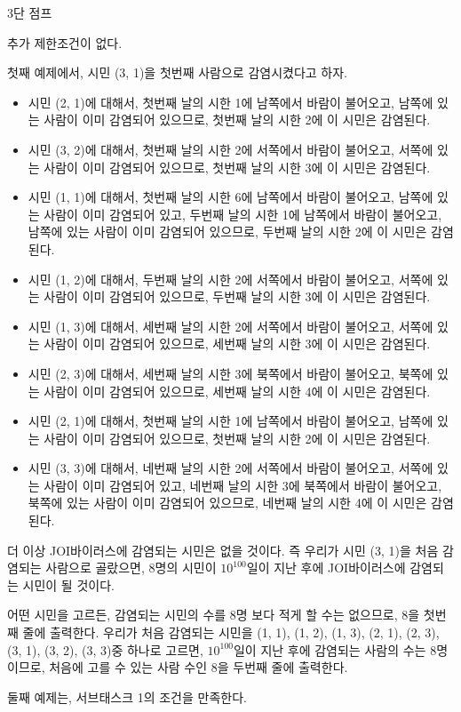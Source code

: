 \begin{problem}{3단 점프}
	
	
	추가 제한조건이 없다.
	
	\Examples
	
	\begin{example}
	\end{example}
	
	\Note
	
	첫째 예제에서, 시민 (3, 1)을 첫번째 사람으로 감염시켰다고 하자.
	
	\begin{itemize}
		\item 시민 (2, 1)에 대해서, 첫번째 날의 시한 1에 남쪽에서 바람이 불어오고, 남쪽에 있는 사람이 이미 감염되어 있으므로, 첫번째 날의 시한 2에 이 시민은 감염된다.
		\item 시민 (3, 2)에 대해서, 첫번째 날의 시한 2에 서쪽에서 바람이 불어오고, 서쪽에 있는 사람이 이미 감염되어 있으므로, 첫번째 날의 시한 3에 이 시민은 감염된다.
		\item 시민 (1, 1)에 대해서, 첫번째 날의 시한 6에 남쪽에서 바람이 불어오고, 남쪽에 있는 사람이 이미 감염되어 있고, 두번째 날의 시한 1에 남쪽에서 바람이 불어오고, 남쪽에 있는 사람이 이미 감염되어 있으므로, 두번째 날의 시한 2에 이 시민은 감염된다.
		\item 시민 (1, 2)에 대해서, 두번째 날의 시한 2에 서쪽에서 바람이 불어오고, 서쪽에 있는 사람이 이미 감염되어 있으므로, 두번째 날의 시한 3에 이 시민은 감염된다.
		\item 시민 (1, 3)에 대해서, 세번째 날의 시한 2에 서쪽에서 바람이 불어오고, 서쪽에 있는 사람이 이미 감염되어 있으므로, 세번째 날의 시한 3에 이 시민은 감염된다.
		\item 시민 (2, 3)에 대해서, 세번째 날의 시한 3에 북쪽에서 바람이 불어오고, 북쪽에 있는 사람이 이미 감염되어 있으므로, 세번째 날의 시한 4에 이 시민은 감염된다.
		\item 시민 (2, 1)에 대해서, 첫번째 날의 시한 1에 남쪽에서 바람이 불어오고, 남쪽에 있는 사람이 이미 감염되어 있으므로, 첫번째 날의 시한 2에 이 시민은 감염된다.
		\item 시민 (3, 3)에 대해서, 네번째 날의 시한 2에 서쪽에서 바람이 불어오고, 서쪽에 있는 사람이 이미 감염되어 있고, 네번째 날의 시한 3에 북쪽에서 바람이 불어오고, 북쪽에 있는 사람이 이미 감염되어 있으므로, 네번째 날의 시한 4에 이 시민은 감염된다.
	\end{itemize}

	더 이상 JOI바이러스에 감염되는 시민은 없을 것이다. 즉 우리가 시민 (3, 1)을 처음 감염되는 사람으로 골랐으면, 8명의 시민이 $10^{100}$일이 지난 후에 JOI바이러스에 감염되는 시민이 될 것이다.
	
	어떤 시민을 고르든, 감염되는 시민의 수를 8명 보다 적게 할 수는 없으므로, 8을 첫번째 줄에 출력한다. 우리가 처음 감염되는 시민을 (1, 1), (1, 2), (1, 3), (2, 1), (2, 3), (3, 1), (3, 2), (3, 3)중 하나로 고르면, $10^{100}$일이 지난 후에 감염되는 사람의 수는 8명이므로, 처음에 고를 수 있는 사람 수인 8을 두번째 줄에 출력한다.
	
	둘째 예제는, 서브태스크 1의 조건을 만족한다.
	
\end{problem}

